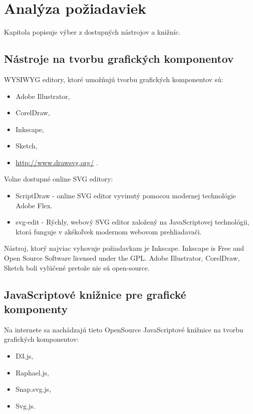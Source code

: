 \chapter{Analýza požiadaviek}
Kapitola popisuje výber z dostupných nástrojov a knižníc. 

\section{Nástroje na tvorbu grafických komponentov}

\acs{WYSIWYG} editory, ktoré umožňujú tvorbu grafických komponentov sú: 

\begin{itemize}
\item Adobe Illustrator, 
\item CorelDraw, 
\item Inkscape,
\item Sketch, 
\item \url{http://www.drawsvg.org/} .
\end{itemize}

Volne dostupné online SVG editory: 
\begin{itemize}
	\item ScriptDraw - online SVG editor vyvinutý pomocou modernej technológie Adobe Flex.
	
	\item svg-edit - Rýchly, webový SVG editor založený na JavaScriptovej technológii, ktorá funguje v akékoľvek modernom webovom prehliadavači. 
	
\end{itemize}



Nástroj, ktorý najviac vyhovuje  požiadavkam je Inkscape. Inkscape is Free and Open Source Software licensed under the GPL.
Adobe Illustrator, CorelDraw, Sketch boli vylúčené pretože nie sú open-source.  




\section{JavaScriptové knižnice pre grafické komponenty}
Na internete sa nachádzajú tieto OpenSource JavaScriptové knižnice na tvorbu grafických komponentov: 
\begin{itemize}
	\item \acs{D3}.js, 
	\item Raphael.js, 
	\item Snap.svg.js,  
	\item Svg.js. 
\end{itemize}



